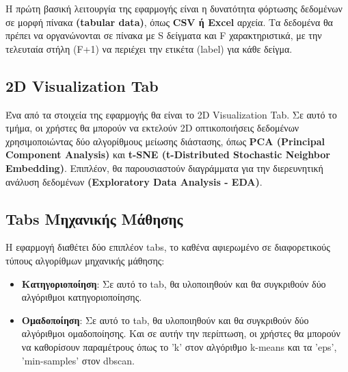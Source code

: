 \documentclass{article}
\begin{document}
Η πρώτη βασική λειτουργία της εφαρμογής είναι η δυνατότητα φόρτωσης δεδομένων σε μορφή πίνακα \textbf{(tabular data)}, όπως \textbf{CSV ή Excel }αρχεία. Τα δεδομένα θα πρέπει να οργανώνονται σε πίνακα με S δείγματα και F  χαρακτηριστικά, με την τελευταία στήλη (F+1) να περιέχει την ετικέτα (label) για κάθε δείγμα.

\subsection{2D Visualization Tab}

Ένα από τα στοιχεία της εφαρμογής θα είναι το 2D Visualization Tab. Σε αυτό το τμήμα, οι χρήστες θα μπορούν να εκτελούν 2D οπτικοποιήσεις δεδομένων χρησιμοποιώντας δύο αλγορίθμους μείωσης διάστασης, όπως \textbf{PCA (Principal Component Analysis)} και \textbf{t-SNE (t-Distributed Stochastic Neighbor Embedding)}. Επιπλέον, θα παρουσιαστούν διαγράμματα για την διερευνητική ανάλυση δεδομένων \textbf{(Exploratory Data Analysis - EDA)}.

\subsection{Tabs Μηχανικής Μάθησης}

Η εφαρμογή διαθέτει δύο επιπλέον tabs, το καθένα αφιερωμένο σε διαφορετικούς τύπους αλγορίθμων μηχανικής μάθησης:
\begin{itemize}
  \item \textbf{Κατηγοριοποίηση}: Σε αυτό το tab, θα υλοποιηθούν και θα συγκριθούν δύο αλγόριθμοι κατηγοριοποίησης.
  \item \textbf{Ομαδοποίηση}: Σε αυτό το tab, θα υλοποιηθούν και θα συγκριθούν δύο αλγόριθμοι ομαδοποίησης. Και σε αυτήν την περίπτωση, οι χρήστες θα μπορούν να καθορίσουν παραμέτρους όπως το 'k' στον αλγόριθμο  k-means και τα 'eps', 'min-samples' στον dbscan.
\end{itemize}
\end{document}

